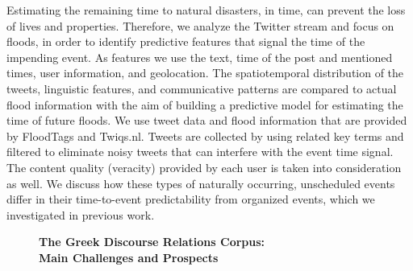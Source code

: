 \documentclass[10pt, a4paper, twopage, headinclude, footinclude, BCOR5mm]{scrartcl}
\begin{document}
{{        \begin{table}[t!]
    \end{table}
        \begin{table}[t!]
    \end{table}

\noindent
Estimating the remaining time to natural disasters, in time, can prevent the loss of lives and properties. Therefore, we analyze the Twitter stream and focus on floods, in order to identify predictive features that signal the time of the impending event. As features we use the text, time of the post and mentioned times, user information, and geolocation. The spatiotemporal distribution of the tweets, linguistic features, and communicative patterns are compared to actual flood information with the aim of building a predictive model for estimating the time of future floods. We use tweet data and flood information that are provided by FloodTags and Twiqs.nl. Tweets are collected by using related key terms and filtered to eliminate noisy tweets that can interfere with the event time signal. The content quality (veracity) provided by each user is taken into consideration as well. We discuss how these types of naturally occurring, unscheduled events differ in their time-to-event predictability from organized events, which we investigated in previous work.


\newpage

\begin{figure}[t!]
\centering
\large\textbf{The Greek Discourse Relations Corpus: \\ Main Challenges and Prospects}
\vspace*{0.5cm}
\end{figure}


}}
\end{document}
